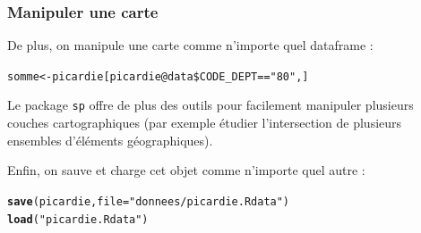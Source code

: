 \documentclass[slidetop, 10pt]{beamer}\usepackage{graphicx, color}
\makeatletter
\newcommand{\hlfunctioncall}[1]{\textcolor[rgb]{0.501960784313725,0,0.329411764705882}{\textbf{#1}}}%
\newcommand{\hlstring}[1]{\textcolor[rgb]{0.6,0.6,1}{#1}}%
\newenvironment{kframe}{%
 \def\at@end@of@kframe{}%
 \ifinner\ifhmode%
  \def\at@end@of@kframe{\end{minipage}}%
  \begin{minipage}{\columnwidth}%
 \fi\fi%
 \def\FrameCommand##1{\hskip\@totalleftmargin \hskip-\fboxsep
 \colorbox{shadecolor}{##1}\hskip-\fboxsep
     \hskip-\linewidth \hskip-\@totalleftmargin \hskip\columnwidth}%
 \MakeFramed {\advance\hsize-\width
   \@totalleftmargin\z@ \linewidth\hsize
   \@setminipage}}%
 {\par\unskip\endMakeFramed%
 \at@end@of@kframe}
\newenvironment{knitrout}{}{} %
\renewenvironment{knitrout}{\begin{tiny}}{\end{tiny}}
\makeatother
\begin{document}
\begin{frame}[fragile]
\frametitle{Manipuler une carte}
De plus, on manipule une carte comme n'importe quel dataframe :

\begin{knitrout}\tiny
{}\color{fgcolor}\begin{kframe}
\begin{alltt}
somme <- picardie[picardie@data\$CODE\_DEPT == \hlstring{"80"}, ]
\end{alltt}
\end{kframe}
\end{knitrout}


Le package \verb!sp! offre de plus des outils pour facilement manipuler plusieurs couches cartographiques (par exemple étudier l'intersection de plusieurs ensembles d'éléments géographiques).

Enfin, on sauve et charge cet objet comme n'importe quel autre :

\begin{knitrout}\tiny
{}\color{fgcolor}\begin{kframe}
\begin{alltt}
\hlfunctioncall{save}(picardie, file = \hlstring{"donnees/picardie.Rdata"})
\hlfunctioncall{load}(\hlstring{"picardie.Rdata"})
\end{alltt}
\end{kframe}
\end{knitrout}


\end{frame}
\end{document}
